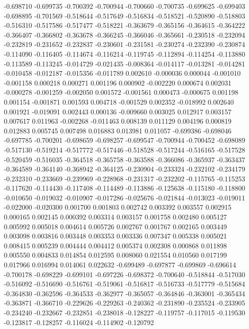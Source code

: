 -0.698710
-0.699735
-0.700392
-0.700944
-0.700660
-0.700735
-0.699625
-0.699403
-0.698895
-0.701569
-0.518644
-0.517649
-0.516834
-0.518521
-0.520890
-0.518803
-0.516310
-0.517586
-0.517477
-0.518221
-0.363679
-0.365156
-0.364615
-0.364222
-0.366407
-0.366802
-0.363678
-0.366245
-0.366046
-0.365661
-0.230518
-0.232094
-0.232819
-0.231652
-0.232837
-0.230601
-0.231581
-0.230274
-0.232390
-0.230874
-0.114090
-0.116405
-0.114674
-0.116214
-0.119745
-0.112894
-0.114254
-0.113880
-0.113589
-0.113245
-0.014729
-0.021435
-0.008364
-0.014117
-0.013281
-0.014281
-0.010458
-0.012187
-0.015356
-0.011789
0.002610
-0.000036
0.000044
-0.001010
-0.001158
0.000218
0.000271
0.001196
0.000902
-0.002220
0.000674
0.002031
-0.000278
-0.001259
-0.002050
0.001572
-0.001561
0.000473
-0.000675
0.001198
0.001154
-0.001871
0.001593
0.004718
-0.001529
0.002352
-0.018992
0.002640
0.001921
-0.019091
0.002443
0.000136
-0.009660
0.003025
0.012917
0.003157
0.007617
0.011963
-0.002268
-0.011463
0.008139
0.011129
0.004196
0.000819
0.012883
0.005745
0.007498
0.016883
0.013981
0.011057
-0.699386
-0.698046
-0.697785
-0.700201
-0.698659
-0.698257
-0.699547
-0.700944
-0.700452
-0.698089
-0.517130
-0.519214
-0.517772
-0.517446
-0.518528
-0.517244
-0.516165
-0.517528
-0.520459
-0.516035
-0.364518
-0.365758
-0.363588
-0.366086
-0.365937
-0.363437
-0.364589
-0.364140
-0.368942
-0.364125
-0.230904
-0.233324
-0.232102
-0.234179
-0.232310
-0.233669
-0.239969
-0.228968
-0.231317
-0.232202
-0.115765
-0.115253
-0.117620
-0.114430
-0.117408
-0.114489
-0.113886
-0.125638
-0.115180
-0.118800
-0.010650
-0.019032
-0.010907
-0.017286
-0.025676
-0.021844
-0.013023
-0.019011
-0.022000
-0.020300
0.001700
0.001803
0.002742
0.003392
0.003557
0.002915
0.000165
0.002145
0.000392
0.003314
0.003157
0.001758
0.002480
0.005127
0.005992
0.005018
0.004614
0.005726
0.002767
0.001767
0.002165
0.003449
0.003098
0.003816
0.003448
0.003353
0.003336
0.007347
0.005338
0.005021
0.008415
0.005239
0.004444
0.004412
0.005374
0.002308
0.000868
0.011898
0.005550
0.004833
0.014854
0.012595
0.008060
0.021554
0.010560
0.017199
0.017966
0.016994
0.014061
0.022632
-0.699489
-0.697877
-0.699869
-0.696614
-0.700178
-0.698229
-0.699101
-0.697226
-0.698372
-0.700640
-0.518844
-0.517030
-0.516092
-0.516690
-0.516761
-0.519061
-0.516817
-0.516733
-0.517779
-0.515684
-0.364830
-0.362596
-0.364533
-0.362977
-0.365057
-0.364846
-0.363001
-0.365434
-0.363871
-0.366710
-0.229626
-0.229263
-0.240362
-0.231890
-0.235524
-0.233905
-0.234240
-0.232667
-0.232851
-0.238018
-0.128227
-0.119757
-0.117015
-0.119530
-0.123817
-0.128257
-0.116024
-0.114902
-0.120792
